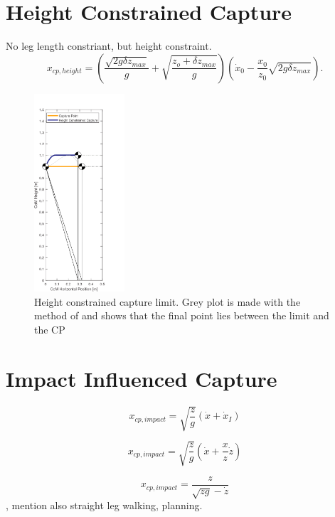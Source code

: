 \section{Height Constrained Capture}
No leg length constriant, but height constraint. 
\begin{equation}
    x_{cp,height}=(\frac{\sqrt{2g\delta z_{max}}}{g}+\sqrt{\frac{z_o+\delta z_{max}}{g}})(\dot{x}_0-\frac{x_0}{z_0}\sqrt{2g\delta z_{max}}).
\end{equation}
\begin{figure}[h]
\centering
\includegraphics[width=0.3\textwidth]{STYLESTUFF/CPvsHeight.png}
\caption{Height constrained capture limit. Grey plot is made with the method of \cite{koolen2016balance} and shows that the final point lies between the limit and the \ac{CP}}
\label{fig:cpheight}
\end{figure}

\section{Impact Influenced Capture}
\begin{equation}
x_{cp,impact} = \sqrt{\frac{z}{g}}(\dot{x}+\dot{x}_I)
\end{equation}

\begin{equation}
x_{cp,impact} = \sqrt{\frac{z}{g}}(\dot{x}+\frac{x}{z}\dot{z})
\end{equation}

\begin{equation}
x_{cp,impact} = \frac{z}{\sqrt{zg}-\dot{z}}
\end{equation}
\cite{kuo2005energetic}, mention also straight leg walking, planning.